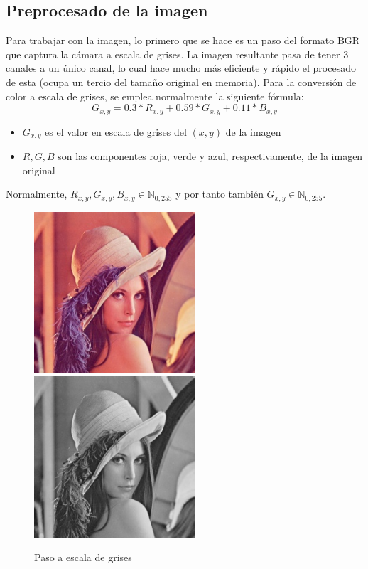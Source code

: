 \subsection{Preprocesado de la imagen}
Para trabajar con la imagen, lo primero que se hace es un paso del formato BGR que captura la cámara a escala de grises. La imagen resultante pasa de tener 3 canales a un único canal, lo cual hace mucho más eficiente y rápido el procesado de esta (ocupa un tercio del tamaño original en memoria). Para la conversión de color a escala de grises, se emplea normalmente la siguiente fórmula\cite{RGB2grayscale}:
\[
	G_{x,y}= 0.3 * R_{x,y} + 0.59 * G_{x,y} + 0.11 * B_{x,y}
\]
\begin{itemize}
	\item{$G_{x,y}$ es el valor en escala de grises del $(x,y)$ de la imagen }
	\item{$R, G, B$ son las componentes roja, verde y azul, respectivamente, de la imagen original}
\end{itemize}
Normalmente, $R_{x,y}, G_{x,y}, B_{x,y} \in \mathbb{N}_{0,255}$ y por tanto también $G_{x,y} \in \mathbb{N}_{0,255}$.

\begin{figure}[h!]
	\centering
	\includegraphics[height=6cm]{imagenes/lena_color_256.jpg}
	\includegraphics[height=6cm]{imagenes/lena_gray_256.jpg}
	\caption{Paso a escala de grises}
	\label{fig:grayscale_conversion}
\end{figure}

